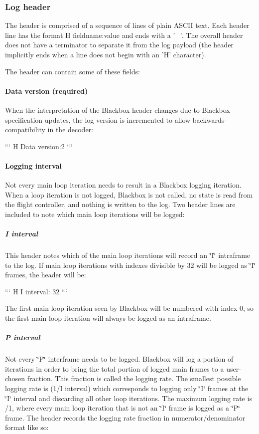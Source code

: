 \subsubsection*{Log header}

The header is comprised of a sequence of lines of plain A\+S\+C\+I\+I text. Each header line has the format {\ttfamily H fieldname\+:value} and ends with a '~\newline
'. The overall header does not have a terminator to separate it from the log payload (the header implicitly ends when a line does not begin with an 'H' character).

The header can contain some of these fields\+:

\paragraph*{Data version (required)}

When the interpretation of the Blackbox header changes due to Blackbox specification updates, the log version is incremented to allow backwards-\/compatibility in the decoder\+:

``` H Data version\+:2 ```

\paragraph*{Logging interval}

Not every main loop iteration needs to result in a Blackbox logging iteration. When a loop iteration is not logged, Blackbox is not called, no state is read from the flight controller, and nothing is written to the log. Two header lines are included to note which main loop iterations will be logged\+:

\subparagraph*{I interval}

This header notes which of the main loop iterations will record an \char`\"{}\+I\char`\"{} intraframe to the log. If main loop iterations with indexes divisible by 32 will be logged as \char`\"{}\+I\char`\"{} frames, the header will be\+:

``` H I interval\+: 32 ```

The first main loop iteration seen by Blackbox will be numbered with index 0, so the first main loop iteration will always be logged as an intraframe.

\subparagraph*{P interval}

Not every \char`\"{}\+P\char`\"{} interframe needs to be logged. Blackbox will log a portion of iterations in order to bring the total portion of logged main frames to a user-\/chosen fraction. This fraction is called the logging rate. The smallest possible logging rate is {\ttfamily (1/\+I interval)} which corresponds to logging only \char`\"{}\+I\char`\"{} frames at the \char`\"{}\+I\char`\"{} interval and discarding all other loop iterations. The maximum logging rate is {/1}, where every main loop iteration that is not an \char`\"{}\+I\char`\"{} frame is logged as a \char`\"{}\+P\char`\"{} frame. The header records the logging rate fraction in {\ttfamily numerator/denominator} format like so\+:

